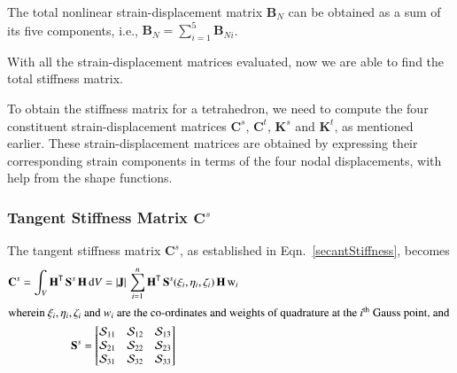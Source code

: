 The total nonlinear strain-displacement matrix $\mathbf{B}_N$ can be obtained as a sum of its five components, i.e., $\mathbf{B}_N = \sum_{i=1}^5 \mathbf{B}_{Ni}$.

With all the strain-displacement matrices evaluated, now we are able to find the total stiffness matrix.


To obtain the stiffness matrix for a tetrahedron, we need to compute the four constituent strain-displacement matrices $\mathbf{C}^s$, $\mathbf{C}^t$, $\mathbf{K}^s$ and $\mathbf{K}^t$, as mentioned earlier. These strain-displacement matrices are obtained by expressing their corresponding strain components in terms of the four nodal displacements, with help from the shape functions.

\subsubsection{Tangent Stiffness Matrix $\mathbf{C}^s$}

The tangent stiffness matrix $\mathbf{C}^s$, as established in Eqn.~\eqref{secantStiffness}, becomes 
\begin{subequations}
	\begin{gather}
		\mathbf{C}^s = \int_{V} \mathbf{H}^{\mathsf{T}} \,  \mathbf{S}^s \, \mathbf{H} \, \mathrm{d} V
		=  | \mathbf{J} |  \, \sum_{i=1}^{n}  \mathbf{H}^{\mathsf{T}} \, \mathbf{S}^s (\xi_i , \eta_i, \zeta_i) \, \mathbf{H} \, \mathrm{w}_i \\
        \intertext{wherein $\xi_i, \eta_i, \zeta_i$ and $w_i$ are the co-ordinates and weights of quadrature at the $i^{\mathrm{th}}$ Gauss point, and 
        }
        \mathbf{S}^s = \begin{bmatrix}
        	\mathcal{S}_{11} & \mathcal{S}_{12} & \mathcal{S}_{13} \\
        	\mathcal{S}_{21} & \mathcal{S}_{22} & \mathcal{S}_{23} \\
        	\mathcal{S}_{31} & \mathcal{S}_{32} & \mathcal{S}_{33}
        	\end{bmatrix}
        \label{stressmtx3D}
	\end{gather}
\end{subequations}


